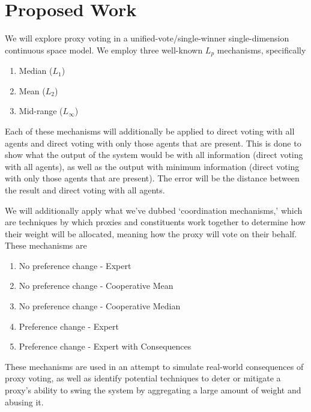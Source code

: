 \section{Proposed Work}\label{sec:contribution}
We will explore proxy voting in a unified-vote/single-winner single-dimension
continuous space model.
We employ three well-known $L_p$ mechanisms, specifically
\begin{enumerate}
    \item {
        Median ($L_1$)
    }
    \item {
        Mean ($L_2$)
    }
    \item {
        Mid-range ($L_\infty$)
    }
\end{enumerate}
Each of these mechanisms will additionally be applied to direct voting with all
agents and direct voting with only those agents that are present.
This is done to show what the output of the system would be with all information
(direct voting with all agents), as well as the output with minimum information
(direct voting with only those agents that are present).
The error will be the distance between the result and direct voting with all agents.

We will additionally apply what we've dubbed `coordination mechanisms,' which are
techniques by which proxies and constituents work together to determine how their
weight will be allocated, meaning how the proxy will vote on their behalf.
These mechanisms are
\begin{enumerate}
    \item {
        No preference change - Expert
    }
    \item {
        No preference change - Cooperative Mean
    }
    \item {
        No preference change - Cooperative Median
    }
    \item {
        Preference change - Expert
    }
    \item {
        Preference change - Expert with Consequences
    }
\end{enumerate}
These mechanisms are used in an attempt to simulate real-world consequences of proxy
voting, as well as identify potential techniques to deter or mitigate a proxy's
ability to swing the system by aggregating a large amount of weight and abusing it.


